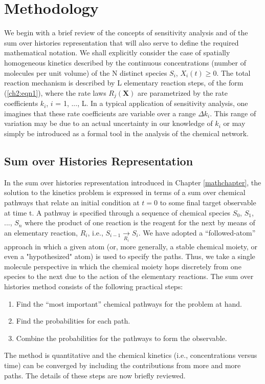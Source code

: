 \section{Methodology}
\label{ch3:metho}
We begin with a brief review of the concepts of sensitivity
analysis and of the sum over histories representation that will
also serve to define the required mathematical notation. We
shall explicitly consider the case of spatially homogeneous
kinetics described by the continuous concentrations (number of molecules per unit volume) of the N distinct species $S_i$, $X_i(t) \geq 0$. The total reaction mechanism is described by L elementary
reaction steps, of the form (\ref{ch2:eqn1}), where the rate laws $R_j(\textbf{X})$ are
parametrized by the rate coefficients $k_i$, $i$ = 1, ..., L. In a typical
application of sensitivity analysis, one imagines that these rate
coefficients are variable over a range $\Delta k_i$. This range of variation
may be due to an actual uncertainty in our knowledge of $k_i$ or
may simply be introduced as a formal tool in the analysis of the
chemical network.

\subsection{Sum over Histories Representation}
In the sum over histories representation introduced in Chapter \ref{mathchapter}, the solution to the kinetics problem is
expressed in terms of a sum over chemical pathways that relate
an initial condition at $t=0$ to some final target observable at
time t. A pathway is specified through a sequence of chemical
species $S_0$, $S_1$, ..., $S_n$ where the product of one reaction is the
reagent for the next by means of an elementary reaction, $R_i$, i.e., $S_{i-1} \xrightarrow[R_i]{} S_i $.
We have adopted a “followed-atom” approach in
which a given atom (or, more generally, a stable chemical
moiety, or even a "hypothesized" atom) is used to specify the paths. Thus, we take a single
molecule perspective in which the chemical moiety hops
discretely from one species to the next due to the action of the
elementary reactions. The sum over histories method consists
of the following practical steps: 
\begin{enumerate}
\item Find the “most important” chemical pathways for the problem at hand.
\item Find the probabilities for each path.
\item Combine the probabilities for the pathways to form the observable.
\end{enumerate}
The method is quantitative and the chemical kinetics (i.e., concentrations
versus time) can be converged by including the contributions
from more and more paths. The details of these steps are now
briefly reviewed.
\newline
